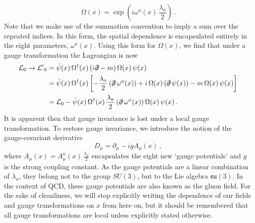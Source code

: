 %
\begin{equation}
\Omega(x)=\exp\left(i\omega^a(x)\,\frac{\lambda_a}{2}\right)\, .
\label{eq:LocalGaugeTransformation}
\end{equation}
%
Note that we make use of the summation convention to imply a sum over the repeated indices. In this form, the spatial dependence is encapsulated entirely in the eight parameters, $\omega^a(x)$.  Using this form for $\Omega(x)$, we find that under a gauge transformation the Lagrangian is now
%
\begin{align}
\mathcal{L}_0\rightarrow\mathcal{L^\prime}_0&=\bar{\psi}(x)\,\Omega^\dag(x)\,(i\slashed{\partial}-m)\,\Omega(x)\,\psi(x)\nonumber\\
&=\bar{\psi}(x)\,\Omega^\dag(x)\left[-\frac{\lambda_a}{2}\,(\slashed{\partial}\,\omega^a(x))+i\,\Omega(x)\,(\slashed{\partial}\,\psi(x))-m\,\Omega(x)\,\psi(x)\right]\nonumber\\
&= \mathcal{L}_0-\bar{\psi}(x)\,\Omega^\dag(x)\,\frac{\lambda_a}{2}\,(\slashed{\partial}\,\omega^a(x))\,\Omega(x)\,\psi(x)\, .
\label{eq:LocalTrans}
\end{align}
%
It is apparent then that gauge invariance is lost under a local gauge transformation. To restore gauge invariance, we introduce the notion of the gauge-covariant derivative
%
\begin{equation}
D_\mu = \partial_\mu - ig A_\mu(x)\, ,
\label{eq:CovariantDerivative}
\end{equation}
%
where $A_\mu(x)=A_\mu^a(x)\,\frac{\lambda_a}{2}$ encapsulates the eight new `gauge potentials' and $g$ is the strong coupling constant. As the gauge potentials are a linear combination of $\lambda_a$, they belong not to the group $SU(3)$, but to the Lie algebra $\mathfrak{su}(3)$. In the context of QCD, these gauge potentials are also known as the gluon field. For the sake of cleanliness, we will stop explicitly writing the dependence of our fields and gauge transformations on $x$ from here on, but it should be remembered that all gauge transformations are local unless explicitly stated otherwise.\\

